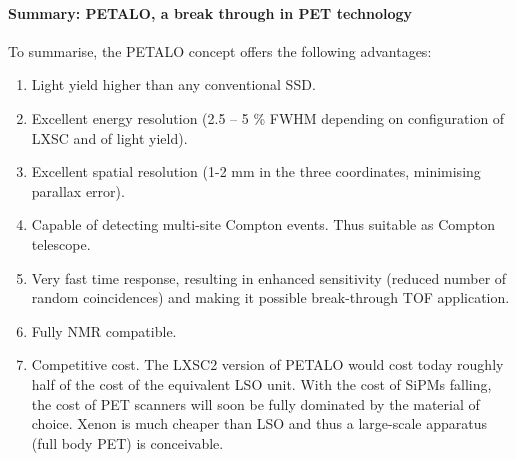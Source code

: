 \paragraph{Summary: PETALO, a break through in PET technology}
To summarise, the PETALO concept offers the following advantages:
\begin{enumerate}
\item Light yield higher than any conventional SSD.
\item Excellent energy resolution (2.5 -- 5 \% FWHM depending on configuration of LXSC and of light yield). 
\item Excellent spatial resolution (1-2 mm in the three coordinates, minimising parallax error).
\item Capable of detecting multi-site Compton events. Thus suitable as Compton telescope.
\item Very fast time response, resulting in enhanced sensitivity (reduced number of random coincidences) and making it possible break-through TOF application. 
\item Fully NMR compatible. 
\item Competitive cost. The LXSC2 version of PETALO would cost today roughly half of the cost of the equivalent LSO unit. With the cost of SiPMs falling, the  cost of PET scanners will soon be fully dominated by the material of choice. Xenon is much cheaper than LSO and thus a large-scale apparatus (full body PET) is conceivable. 
\end{enumerate}

 

